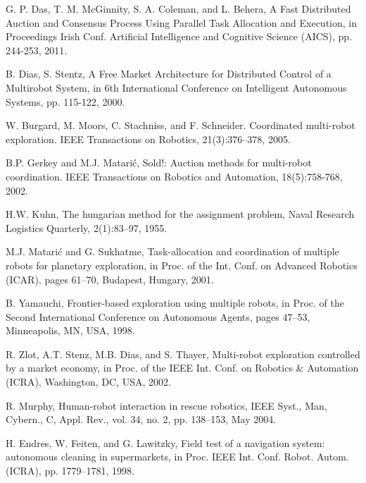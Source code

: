 \documentclass[letterpaper, 10 pt, conference]{ieeeconf}  %
\begin{document}



\begin{thebibliography}{99}

 G. P. Das, T. M. McGinnity, S. A. Coleman, and L. Behera, A Fast Distributed Auction and Consensus Process Using Parallel Task Allocation and Execution, in Proceedings Irish Conf. Artificial Intelligence and Cognitive Science (AICS), pp. 244-253, 2011.

 B. Dias, S. Stentz, A Free Market Architecture for Distributed Control of a Multirobot System, in 6th International Conference on Intelligent Autonomous Systems, pp. 115-122, 2000.

 W. Burgard, M. Moors, C. Stachniss, and F. Schneider. Coordinated multi-robot exploration. IEEE Transactions on Robotics, 21(3):376–378, 2005.

 B.P. Gerkey and M.J. Matarić, Sold!: Auction methods for multi-robot coordination. IEEE Transactions on Robotics and Automation,
18(5):758-768, 2002.

 H.W. Kuhn, The hungarian method for the assignment problem, Naval Research Logistics Quarterly, 2(1):83–97, 1955.

 M.J. Matarić and G. Sukhatme, Task-allocation and coordination of
multiple robots for planetary exploration, in Proc. of the Int. Conf. on Advanced Robotics (ICAR), pages 61–70, Budapest, Hungary, 2001.

 B. Yamauchi, Frontier-based exploration using multiple robots, in
Proc. of the Second International Conference on Autonomous Agents, pages 47–53, Minneapolis, MN, USA, 1998.

 R. Zlot, A.T. Stenz, M.B. Dias, and S. Thayer, Multi-robot exploration controlled by a market economy, in Proc. of the IEEE Int. Conf. on Robotics & Automation (ICRA), Washington, DC, USA, 2002.

 R. Murphy, Human-robot interaction in rescue robotics, IEEE Syst., Man, Cybern., C, Appl. Rev., vol. 34, no. 2, pp. 138–153, May 2004.

 H. Endres, W. Feiten, and G. Lawitzky, Field test of a navigation system: autonomous cleaning in supermarkets, in Proc. IEEE Int. Conf. Robot. Autom. (ICRA), pp. 1779–1781, 1998.


\end{thebibliography}
\end{document}

